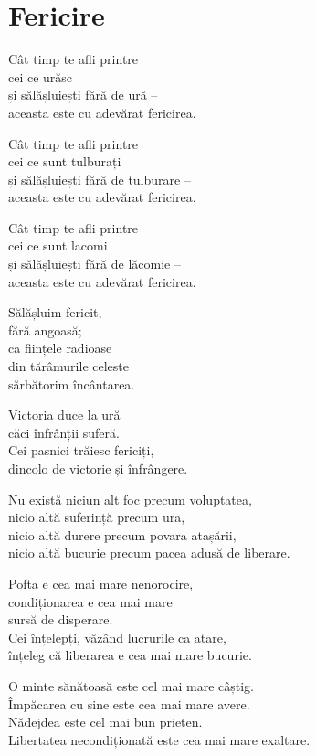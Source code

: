 
\chapter{Fericire}


Cât timp te afli printre\\
cei ce urăsc\\
și sălășluiești fără de ură –\\
aceasta este cu adevărat fericirea.


Cât timp te afli printre\\
cei ce sunt tulburați\\
și sălășluiești fără de tulburare –\\
aceasta este cu adevărat fericirea.


Cât timp te afli printre\\
cei ce sunt lacomi\\
și sălășluiești fără de lăcomie –\\
aceasta este cu adevărat fericirea.


Sălășluim fericit,\\
fără angoasă;\\
ca ființele radioase\\
din tărâmurile celeste\\
sărbătorim încântarea.


Victoria duce la ură\\
căci înfrânții suferă.\\
Cei pașnici trăiesc fericiți,\\
dincolo de victorie și înfrângere.


Nu există niciun alt foc precum voluptatea,\\
nicio altă suferință precum ura,\\
nicio altă durere precum povara atașării,\\
nicio altă bucurie precum pacea adusă de liberare.


Pofta e cea mai mare nenorocire,\\
condiționarea e cea mai mare\\
sursă de disperare.\\
Cei înțelepți, văzând lucrurile ca atare,\\
înțeleg că liberarea e cea mai mare bucurie.

O minte sănătoasă este cel mai mare câștig.\\
Împăcarea cu sine este cea mai mare avere.\\
Nădejdea este cel mai bun prieten.\\
Libertatea necondiționată este cea mai mare exaltare.


